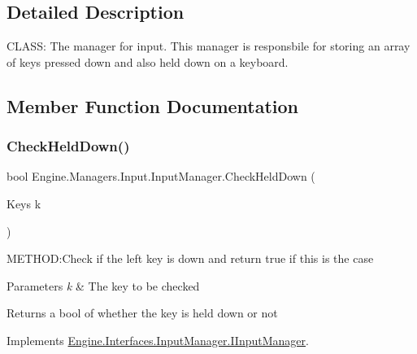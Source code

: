 \subsection{Detailed Description}
C\+L\+A\+SS\+: The manager for input. This manager is responsbile for storing an array of keys pressed down and also held down on a keyboard. 



\subsection{Member Function Documentation}
\mbox{\label{a00522_a40428e54a6265c8e18c51489321b1d4c}} 
\subsubsection{\texorpdfstring{Check\+Held\+Down()}{CheckHeldDown()}}
{\footnotesize\ttfamily bool Engine.\+Managers.\+Input.\+Input\+Manager.\+Check\+Held\+Down (\begin{DoxyParamCaption}\item[{Keys}]{k }\end{DoxyParamCaption})\hspace{0.3cm}{\ttfamily [inline]}}



M\+E\+T\+H\+OD\+:Check if the left key is down and return true if this is the case 


\begin{DoxyParams}{Parameters}
{\em k} & The key to be checked\\
\hline
\end{DoxyParams}
\begin{DoxyReturn}{Returns}
a bool of whether the key is held down or not
\end{DoxyReturn}


Implements \hyperlink{a00450_a661496081120efdcd653693977f36fd9}{Engine.\+Interfaces.\+Input\+Manager.\+I\+Input\+Manager}.

\mbox{\label{a00522_aeb5c9f3f44ec0f9468cf3ec6801b9b24}} 

